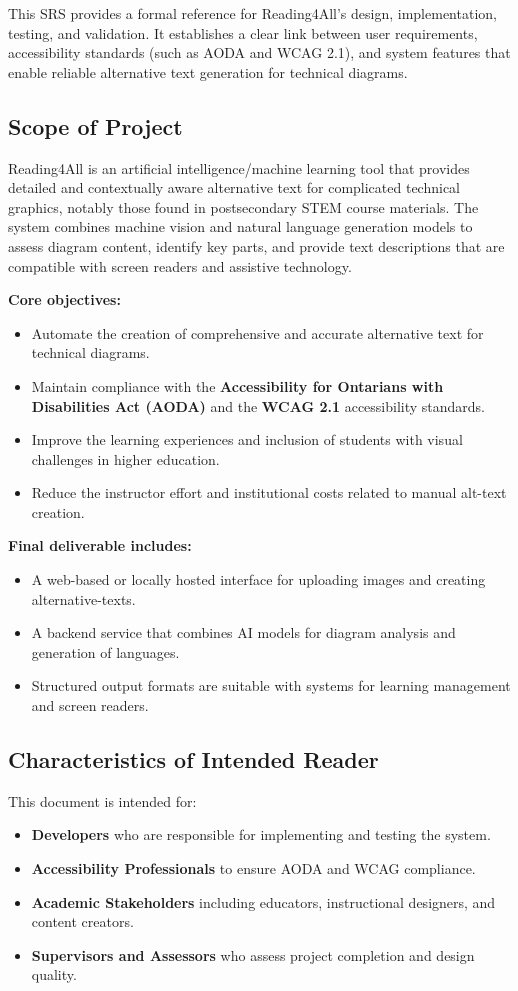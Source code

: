 \documentclass[12pt]{article}
\begin{document}
This SRS provides a formal reference for Reading4All's design, implementation, testing, and validation. It establishes a clear link between user requirements, accessibility standards (such as AODA and WCAG 2.1), and system features that enable reliable alternative text generation for technical diagrams.

\subsection{Scope of Project}
Reading4All is an artificial intelligence/machine learning tool that provides detailed and contextually aware alternative text for complicated technical graphics, notably those found in postsecondary STEM course materials. The system combines machine vision and natural language generation models to assess diagram content, identify key parts, and provide text descriptions that are compatible with screen readers and assistive technology.

\noindent \textbf{Core objectives:}
\begin{itemize}
    \item Automate the creation of comprehensive and accurate alternative text for technical diagrams.
    \item Maintain compliance with the \textbf{Accessibility for Ontarians with Disabilities Act (AODA)} and the \textbf{WCAG 2.1} accessibility standards.
    \item Improve the learning experiences and inclusion of students with visual challenges in higher education.
    \item Reduce the instructor effort and institutional costs related to manual alt-text creation.
\end{itemize}

\noindent \textbf{Final deliverable includes:}
\begin{itemize}
    \item A web-based or locally hosted interface for uploading images and creating alternative-texts.
    \item A backend service that combines AI models for diagram analysis and generation of languages.
    \item Structured output formats are suitable with systems for learning management and screen readers.
\end{itemize}

\subsection{Characteristics of Intended Reader}
This document is intended for:
\begin{itemize}
    \item \textbf{Developers} who are responsible for implementing and testing the system.
    \item \textbf{Accessibility Professionals} to ensure AODA and WCAG compliance.
    \item \textbf{Academic Stakeholders} including educators, instructional designers, and content creators.
    \item \textbf{Supervisors and Assessors} who assess project completion and design quality.
\end{itemize}
\end{document}
